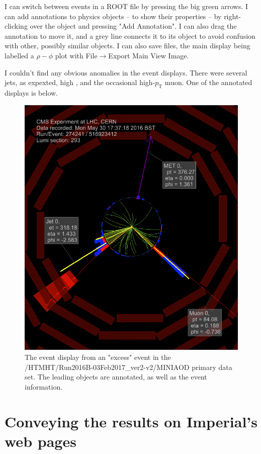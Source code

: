 I can switch between events in a ROOT file by pressing the big green arrows. I can add annotations to physics objects -- to show their properties -- by right-clicking over the object and pressing "Add Annotation". I can also drag the annotation to move it, and a grey line connects it to its object to avoid confusion with other, possibly similar objects. I can also save files, the main display being labelled a $\rho-\phi$ plot with File$\rightarrow$Export Main View Image.

I couldn't find any obvious anomalies in the event displays. There were several jets, as expexted, high \etmiss, and the occasional high-$p_{\mathrm{T}}$ muon. One of the annotated displays is below.

\begin{figure}[H]
\centering
\includegraphics[width=120mm]{./sec27/skimHTMHT_Run2016B_3j_3b_ev1.png}
\caption{The event display from an "excess" event in the /HTMHT/Run2016B-03Feb2017\_ver2-v2/MINIAOD primary data set. The leading objects are annotated, as well as the event information.}
\end{figure}


\section{Conveying the results on Imperial's web pages}


